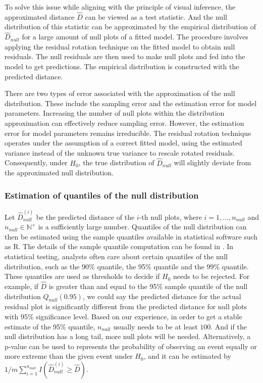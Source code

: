 \documentclass[]{interact}
\theoremstyle{plain}%
\theoremstyle{definition}
\theoremstyle{remark}
\begin{document}
To solve this issue while aligning with the principle of visual
inference, the approximated distance \(\hat{D}\) can be viewed as a test
statistic. And the null distribution of this statistic can be
approximated by the empirical distribution of \(\hat{D}_{null}\) for a
large amount of null plots of a fitted model. The procedure involves
applying the residual rotation technique \citep{buja2009statistical} on
the fitted model to obtain null residuals. The null residuals are then
used to make null plots and fed into the model to get predictions. The
empirical distribution is constructed with the predicted distance.

There are two types of error associated with the approximation of the
null distribution. These include the sampling error and the estimation
error for model parameters. Increasing the number of null plots within
the distribution approximation can effectively reduce sampling error.
However, the estimation error for model parameters remains irreducible.
The residual rotation technique operates under the assumption of a
correct fitted model, using the estimated variance instead of the
unknown true variance to rescale rotated residuals. Consequently, under
\(H_0\), the true distribution of \(\hat{D}_{null}\) will slightly
deviate from the approximated null distribution.

\hypertarget{estimation-of-quantiles-of-the-null-distribution}{%
\subsubsection{Estimation of quantiles of the null
distribution}\label{estimation-of-quantiles-of-the-null-distribution}}

Let \(\hat{D}_{null}^{(i)}\) be the predicted distance of the \(i\)-th
null plots, where \(i = 1,...,n_{null}\) and
\(n_{null} \in \mathbb{N}^+\) is a sufficiently large number. Quantiles
of the null distribution can then be estimated using the sample
quantiles available in statistical software such as R. The details of
the sample quantile computation can be found in
\citet{hyndman1996sample}. In statistical testing, analysts often care
about certain quantiles of the null distribution, such as the 90\%
quantile, the 95\% quantile and the 99\% quantile. These quantiles are
used as thresholds to decide if \(H_0\) needs to be rejected. For
example, if \(\hat{D}\) is greater than and equal to the 95\% sample
quantile of the null distribution \(Q_{null}(0.95)\), we could say the
predicted distance for the actual residual plot is significantly
different from the predicted distance for null plots with 95\%
significance level. Based on our experience, in order to get a stable
estimate of the 95\% quantile, \(n_{null}\) usually needs to be at least
\(100\). And if the null distribution has a long tail, more null plots
will be needed. Alternatively, a p-value can be used to represents the
probability of observing an event equally or more extreme than the given
event under \(H_0\), and it can be estimated by
\(1/m\sum_{i=1}^{n_{null}}I\left(\hat{D}_{null}^{(i)} \geq \hat{D}\right)\).
\end{document}
